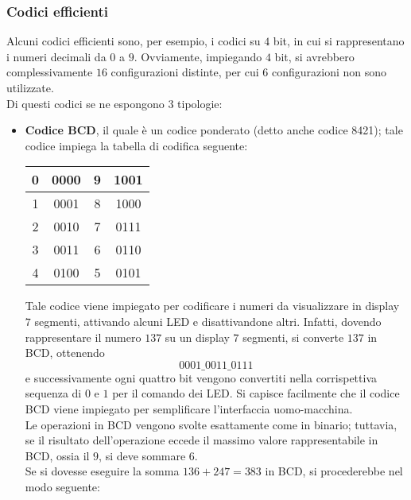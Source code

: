 \documentclass[a4paper]{extarticle}
\renewcommand\arraystretch{}
\begin{document}
\vspace{1em}
\noindent
\subsubsection{Codici efficienti}
Alcuni codici efficienti sono, per esempio, i codici su $4$ bit, in cui si rappresentano i numeri decimali da $0$ a $9$. Ovviamente, impiegando $4$ bit, si avrebbero complessivamente $16$ configurazioni distinte, per cui $6$ configurazioni non sono utilizzate.\\
Di questi codici se ne espongono $3$ tipologie:
\begin{itemize}
    \item \textbf{Codice BCD}, il quale è un codice ponderato (detto anche codice 8421); tale codice impiega la tabella di codifica seguente:
    
    \noindent
    \begin{table}[H]
    \setlength{\tabcolsep}{4pt}
    \renewcommand{\arraystretch}{1.2}
    \centering
    \begin{tabular}{|c|c|c|c|}
        \hline
        0 & 0000 & 9 & 1001\\
        \hline
        1 & 0001 & 8 & 1000\\
        \hline
        2 & 0010 & 7 & 0111\\
        \hline
        3 & 0011 & 6 & 0110\\
        \hline
        4 & 0100 & 5 & 0101\\
        \hline
    \end{tabular}
    \end{table}

    \noindent
    Tale codice viene impiegato per codificare i numeri da visualizzare in display $7$ segmenti, attivando alcuni LED e disattivandone altri. Infatti, dovendo rappresentare il numero $137$ su un display $7$ segmenti, si converte $137$ in BCD, ottenendo
    \[0001\_0011\_0111\]
    e successivamente ogni quattro bit vengono convertiti nella corrispettiva sequenza di $0$ e $1$ per il comando dei LED. Si capisce facilmente che il codice BCD viene impiegato per semplificare l'interfaccia uomo-macchina.\\
    Le operazioni in BCD vengono svolte esattamente come in binario; tuttavia, se il risultato dell'operazione eccede il massimo valore rappresentabile in BCD, ossia il $9$, si deve sommare $6$.\\
    Se si dovesse eseguire la somma $136+247=383$ in BCD, si procederebbe nel modo seguente:
    

\end{itemize}
\end{document}
